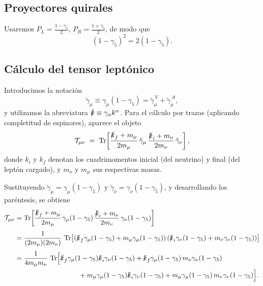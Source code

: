 \subsection{Proyectores quirales}
Usaremos \(P_L=\frac{1-\gamma_5}{2}\), \(P_R=\frac{1+\gamma_5}{2}\), de modo que
\begin{equation}
(1-\gamma_5)^2 = 2(1-\gamma_5).
\end{equation}

\subsection{Cálculo del tensor leptónico}
\label{app:trazas:tensor_leptonico}

Introducimos la notación
\begin{equation}
\tilde{\gamma}_\mu \equiv \gamma_\mu(1-\gamma_5)
= \tilde{\gamma}_\mu^{\,V} + \tilde{\gamma}_\mu^{\,A},
\end{equation}
y utilizamos la abreviatura \(\slashed{k}\equiv \gamma_\alpha k^\alpha\). Para el cálculo por trazas
(aplicando completitud de espinores), aparece el objeto
\begin{equation}
\mathcal{T}_{\mu \nu}
\;=\;
\Tr\!\left[
\frac{\slashed{k}_f+m_\mu}{2m_\mu}\,\tilde{\gamma}_\mu\,
\frac{\slashed{k}_i+m_\nu}{2m_\nu}\,\tilde{\gamma}_\nu
\right],
\label{eq:app_T_mu0_def}
\end{equation}
donde \(k_i\) y \(k_f\) denotan los cuadrimomentos inicial (del neutrino) y final (del leptón cargado),
y \(m_\nu\) y \(m_\mu\) sus respectivas masas.

Sustituyendo \(\tilde{\gamma}_\mu=\gamma_\mu(1-\gamma_5)\) y \(\tilde{\gamma}_\nu=\gamma_\nu(1-\gamma_5)\),
y desarrollando los paréntesis, se obtiene
\begin{align}
\mathcal{T}_{\mu \nu}
&=
\Tr\!\left[
\frac{\slashed{k}_f+m_\mu}{2m_\mu}\,\gamma_\mu(1-\gamma_5)\,
\frac{\slashed{k}_i+m_\nu}{2m_\nu}\,\gamma_\nu(1-\gamma_5)
\right]
\nonumber\\[3pt]
&=
\frac{1}{(2m_\mu)(2m_\nu)}\,
\Tr\!\left[
(\slashed{k}_f\gamma_\mu(1-\gamma_5)+m_\mu\gamma_\mu(1-\gamma_5))\,
(\slashed{k}_i\gamma_\nu(1-\gamma_5)+m_\nu\gamma_\nu(1-\gamma_5))
\right]
\nonumber\\[3pt]
&=
\frac{1}{4m_\mu m_\nu}\,
\Tr\!\Big[
\slashed{k}_f\gamma_\mu(1-\gamma_5)\slashed{k}_i\gamma_\nu(1-\gamma_5)
+\slashed{k}_f\gamma_\mu(1-\gamma_5)\,m_\nu\gamma_\nu(1-\gamma_5)
\nonumber\\
&\hspace{3.3cm}
+m_\mu\gamma_\mu(1-\gamma_5)\slashed{k}_i\gamma_\nu(1-\gamma_5)
+m_\mu\gamma_\mu(1-\gamma_5)\,m_\nu\gamma_\nu(1-\gamma_5)
\Big].
\label{eq:app_T_mu0_expand}
\end{align}

